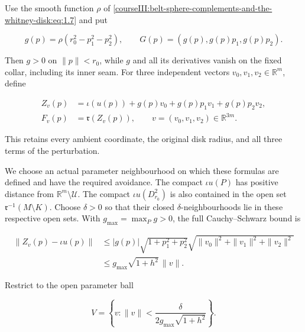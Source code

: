 Use the smooth function \(\rho\) of \eqref{courseIII:belt-sphere-complements-and-the-whitney-disk:eq:1.7} and put

\begin{equation}
g(p)=\rho(r_0^2-p_1^2-p_2^2),\qquad
G(p)=(g(p),g(p)p_1,g(p)p_2).
\label{courseIII:belt-sphere-complements-and-the-whitney-disk:eq:5.3}
\end{equation}

Then \(g>0\) on \(\|p\|<r_0\), while \(g\) and all its derivatives vanish on the fixed collar, including its inner seam. For three independent vectors \(v_0,v_1,v_2\in\mathbb R^m\), define

\begin{equation}
\begin{aligned}
Z_v(p)&=\iota(u(p))+g(p)v_0+g(p)p_1v_1+g(p)p_2v_2,\\
F_v(p)&=\mathfrak r(Z_v(p)),\qquad
v=(v_0,v_1,v_2)\in\mathbb R^{3m}.
\end{aligned}
\label{courseIII:belt-sphere-complements-and-the-whitney-disk:eq:5.4}
\end{equation}

This retains every ambient coordinate, the original disk radius, and all three terms of the perturbation.

We choose an actual parameter neighbourhood on which these formulas are defined and have the required avoidance. The compact \(\iota u(P)\) has positive distance from \(\mathbb R^m\setminus\mathcal U\). The compact \(\iota u(D_{r_0}^2)\) is also contained in the open set \(\mathfrak r^{-1}(M\setminus K)\). Choose \(\delta>0\) so that their closed \(\delta\)-neighbourhoods lie in these respective open sets. With \(g_{\max}=\max_P g>0\), the full Cauchy--Schwarz bound is

\begin{equation}
\begin{aligned}
\|Z_v(p)-\iota u(p)\|
&\leq |g(p)|\sqrt{1+p_1^2+p_2^2}
 \sqrt{\|v_0\|^2+\|v_1\|^2+\|v_2\|^2}\\
&\leq g_{\max}\sqrt{1+h^2}\,\|v\|.
\end{aligned}
\label{courseIII:belt-sphere-complements-and-the-whitney-disk:eq:5.5}
\end{equation}

Restrict to the open parameter ball

\begin{equation}
V=\left\{v:\|v\|<
\frac{\delta}{2g_{\max}\sqrt{1+h^2}}\right\}.
\label{courseIII:belt-sphere-complements-and-the-whitney-disk:eq:5.6}
\end{equation}

